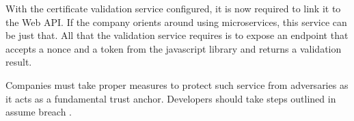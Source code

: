 With the certificate validation service configured, it is now required to link it to the Web API. If the company orients around using microservices, this service can be just that. All that the validation service requires is to expose an endpoint that accepts a nonce and a token from the javascript library and returns a validation result.

Companies must take proper measures to protect such service from adversaries as it acts as a fundamental trust anchor. Developers should take steps outlined in assume breach .


